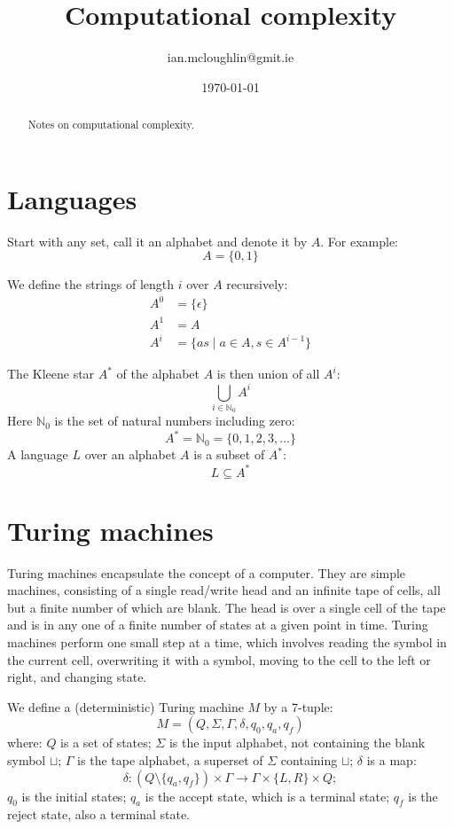 

\title{Computational complexity}
\author{ian.mcloughlin@gmit.ie}
\date{\today}



\maketitle

\begin{abstract}
  Notes on computational complexity.
\end{abstract}

\section{Languages}
  Start with any set, call it an alphabet and denote it by \( A \).
  For example:
  \[ A = \{ 0, 1 \} \]

  We define the strings of length \( i \) over \( A \) recursively:
  \begin{align*}
    A^0 &= \{ \epsilon \} \\
    A^1 &= A \\
    A^{i} &= \{ as \mid a \in A, s \in A^{i-1} \}
  \end{align*}

  The Kleene star \( A^* \) of the alphabet \( A \) is then union of all \( A^i \):
  \[ \bigcup_{i \in \mathbb{N}_0} A^i\]
  Here \( \mathbb{N}_0 \) is the set of natural numbers including zero:
  \[ A^* = \mathbb{N}_0 = \{ 0, 1, 2, 3, \ldots \} \]
  A language \( L \) over an alphabet \( A \) is a subset of \( A^* \):
  \[ L \subseteq A^* \]

\section{Turing machines}
  Turing machines encapsulate the concept of a computer.
  They are simple machines, consisting of a single read/write head and an infinite tape of cells, all but a finite number of which are blank.  
  The head is over a single cell of the tape and is in any one of a finite number of states at a given point in time.
  Turing machines perform one small step at a time, which involves reading the symbol in the current cell, overwriting it with a symbol, moving to the cell to the left or right, and changing state.

  We define a (deterministic) Turing machine \( M \) by a 7-tuple:
  \[ M = ( Q, \Sigma, \Gamma, \delta, q_0, q_a, q_f ) \]
  where:
  \( Q \) is a set of states;
  \( \Sigma \) is the input alphabet, not containing the blank symbol \( \sqcup \);
  \( \Gamma \) is the tape alphabet, a superset of \( \Sigma \) containing \( \sqcup \);
  \( \delta \) is a map:
  \[ \delta: (Q \setminus \{ q_a, q_f \}) \times \Gamma \rightarrow \Gamma \times \{ L, R \} \times Q; \]
  \( q_0 \) is the initial states;
  \( q_a \) is the accept state, which is a terminal state;
  \( q_f \) is the reject state, also a terminal state.  
  
